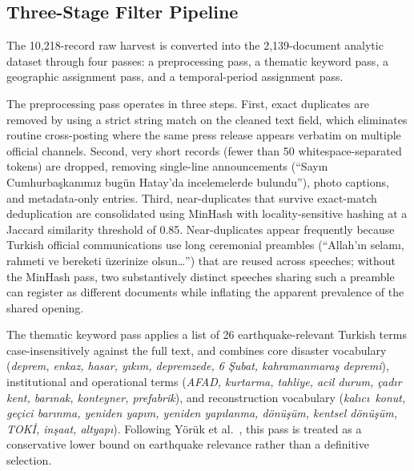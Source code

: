 \documentclass[12pt, journal]{IEEEtran}
\begin{document}
\subsection{Three-Stage Filter Pipeline}
The 10,218-record raw harvest is converted into the 2,139-document analytic dataset through four passes: a preprocessing pass, a thematic keyword pass, a geographic assignment pass, and a temporal-period assignment pass.

The preprocessing pass operates in three steps. First, exact duplicates are removed by using a strict string match on the cleaned text field, which eliminates routine cross-posting where the same press release appears verbatim on multiple official channels. Second, very short records (fewer than 50 whitespace-separated tokens) are dropped, removing single-line announcements (``Say\i n Cumhurba\c{s}kan\i m\i z bug\"un Hatay'da incelemelerde bulundu''), photo captions, and metadata-only entries. Third, near-duplicates that survive exact-match deduplication are consolidated using MinHash with locality-sensitive hashing at a Jaccard similarity threshold of 0.85. Near-duplicates appear frequently because Turkish official communications use long ceremonial preambles (``Allah'\i n selam\i, rahmeti ve bereketi \"uzerinize olsun\ldots'') that are reused across speeches; without the MinHash pass, two substantively distinct speeches sharing such a preamble can register as different documents while inflating the apparent prevalence of the shared opening.

The thematic keyword pass applies a list of 26 earthquake-relevant Turkish terms case-insensitively against the full text, and combines core disaster vocabulary (\textit{deprem, enkaz, hasar, y\i k\i m, depremzede, 6 \c{S}ubat, kahramanmara\c{s} depremi}), institutional and operational terms (\textit{AFAD, kurtarma, tahliye, acil durum, \c{c}ad\i r kent, bar\i nak, konteyner, prefabrik}), and reconstruction vocabulary (\textit{kal\i c\i\ konut, ge\c{c}ici bar\i nma, yeniden yap\i m, yeniden yap\i lanma, d\"on\"u\c{s}\"um, kentsel d\"on\"u\c{s}\"um, TOK\.{I}, in\c{s}aat, altyap\i}). Following Y\"or\"uk et al.~\cite{yoruk2022random}, this pass is treated as a conservative lower bound on earthquake relevance rather than a definitive selection.
\end{document}

